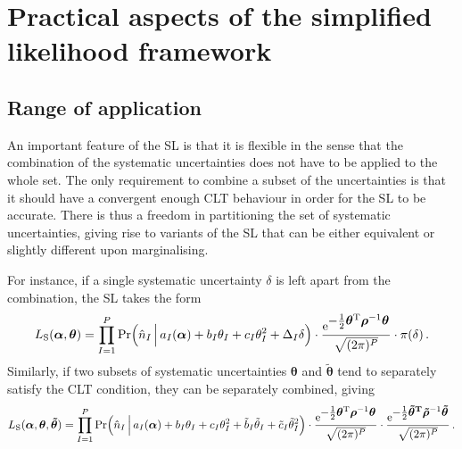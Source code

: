 \documentclass[11pt]{article}
\newcommand{\be}{\begin{equation}}
\newcommand{\ee}{\end{equation}}
\begin{document}
\section{Practical aspects of the simplified likelihood framework}
\label{se:practice}

\subsection{Range of application}
\label{se:application}
An important feature of the SL is that it is flexible in the sense that the combination of the systematic uncertainties does not have to be applied to the whole set.  The only requirement to combine a subset of the  uncertainties is that it should have a convergent enough  CLT behaviour in order  for the SL to be accurate. There is thus a freedom in partitioning the set of systematic uncertainties, giving rise to variants of the SL that can be either equivalent or slightly different upon  marginalising.


For instance, if a single systematic uncertainty $\delta$ is left apart from the combination, the SL takes the form
\be
 L_{\rm{S}}(\bm{\alpha},\bm{\theta}) = \prod_{I=1}^P \mathrm{Pr}\Big( \hat{n}_I\,\Big|\,a_{I}(\bm{\alpha})+b_I\theta_I+c_I\theta_I^2 + \Delta_I  \delta   \Big) \cdot
    \frac{ \mathrm{e}^{{\textstyle-\frac{1}{2}\bm \theta^{\rm T} \bm{\rho}^{-1} \bm \theta}}}{\sqrt{(2\pi)^P }}
    \cdot \pi(\delta) \,. \label{eq:SL_variants1}
\ee
Similarly, if two subsets of systematic uncertainties $\bm{\theta}$ and $\bm{\tilde \theta}$ tend to  separately satisfy the CLT condition,  they can be separately combined, giving  
\be
 L_{\rm{S}}(\bm{\alpha},\bm{\theta},\bm{\tilde \theta}) = \prod_{I=1}^P \mathrm{Pr}\Big( \hat{n}_I\,\Big|\,a_{I}(\bm{\alpha})+b_I\theta_I+c_I\theta_I^2 + \tilde b_I \tilde \theta_I+ \tilde c_I \tilde \theta_I^2  \Big) \cdot
    \frac{ \mathrm{e}^{{\textstyle-\frac{1}{2}\bm \theta^{\rm T} \bm{\rho}^{-1} \bm \theta}}}{\sqrt{(2\pi)^P }}
\cdot \frac{ \mathrm{e}^{{\textstyle-\frac{1}{2}\bm{ \tilde\theta^{\rm T}} \bm{\tilde \rho}^{-1} \bm{ \tilde\theta}}}}{\sqrt{(2\pi)^P }}
      \,. \label{eq:SL_variants2}
\ee
\end{document}
